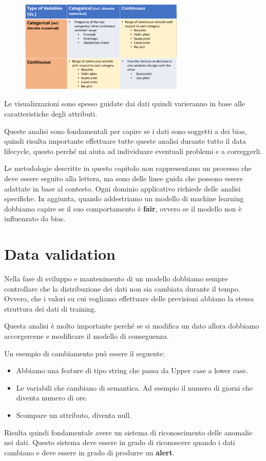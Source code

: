 \begin{figure}[!h]
      \centering
      \includegraphics[width=0.7\textwidth]{img/MLops/exploration.png}
\end{figure}

Le visualizzazioni sono spesso guidate dai dati quindi varieranno in base alle 
caratteristiche degli attributi.

Queste analisi sono fondamentali per capire se i dati sono soggetti a dei bias,
quindi risulta importante effettuare tutte queste analisi durante tutto il data lifecycle,
questo perché mi aiuta ad individuare eventuali problemi e a correggerli.

Le metodologie descritte in questo capitolo non rappresentano un processo che deve
essere seguito alla lettera, ma sono delle linee guida che possono essere adattate
in base al contesto. Ogni dominio applicativo richiede delle analisi specifiche.
In aggiunta, quando addestriamo un modello di machine learning dobbiamo capire se
il suo comportamento è \textbf{fair}, ovvero se il modello non è influenzato da
bias.

\section{Data validation}
Nella fase di sviluppo e mantenimento di un modello dobbiamo sempre controllare
che la distribuzione dei dati non sia cambiata durante il tempo.
Ovvero, che i valori su cui vogliamo effettuare delle previsioni abbiano la stessa
struttura dei dati di training.

Questa analisi è molto importante perché se si modifica un dato allora dobbiamo
accorgercene e modificare il modello di conseguenza.

Un esempio di cambiamento può essere il seguente:
\begin{itemize}
      \item Abbiamo una feature di tipo string che passa da Upper case a lower case.
      \item Le variabili che cambiano di semantica. Ad esempio il numero di giorni
            che diventa numero di ore.
      \item Scompare un attributo, diventa null.
\end{itemize}
Risulta quindi fondamentale avere un sistema di riconoscimento delle anomalie
nei dati. Questo sistema deve essere in grado di riconoscere quando i dati cambiano
e deve essere in grado di produrre un \textbf{alert}.

